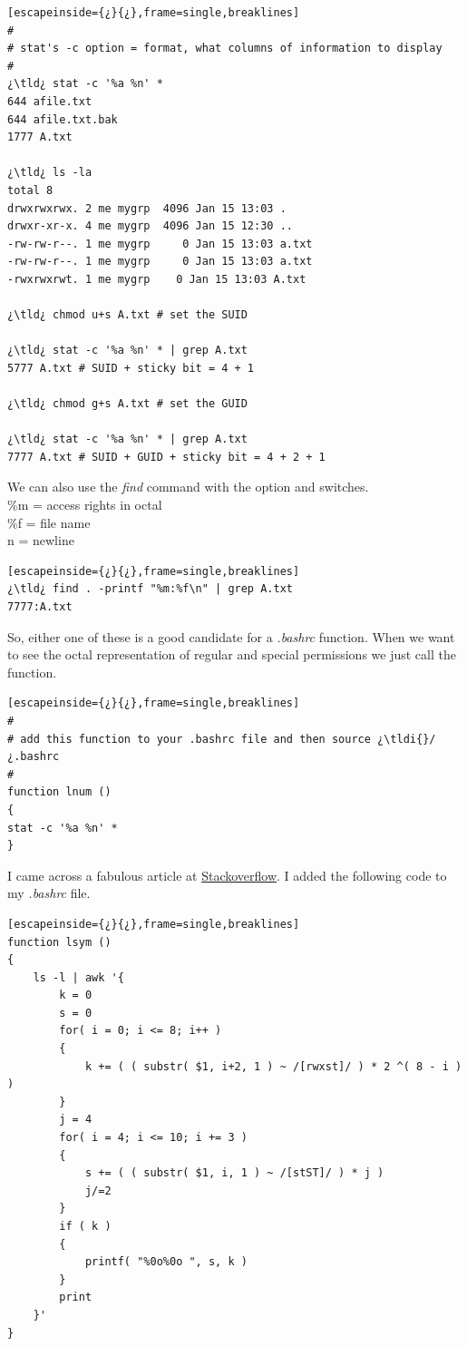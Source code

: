 \begin{lstlisting}[escapeinside={¿}{¿},frame=single,breaklines]
#
# stat's -c option = format, what columns of information to display
#
¿\tld¿ stat -c '%a %n' *
644 afile.txt
644 afile.txt.bak
1777 A.txt

¿\tld¿ ls -la
total 8
drwxrwxrwx. 2 me mygrp  4096 Jan 15 13:03 .
drwxr-xr-x. 4 me mygrp  4096 Jan 15 12:30 ..
-rw-rw-r--. 1 me mygrp     0 Jan 15 13:03 a.txt
-rw-rw-r--. 1 me mygrp     0 Jan 15 13:03 a.txt
-rwxrwxrwt. 1 me mygrp    0 Jan 15 13:03 A.txt

¿\tld¿ chmod u+s A.txt # set the SUID

¿\tld¿ stat -c '%a %n' * | grep A.txt
5777 A.txt # SUID + sticky bit = 4 + 1

¿\tld¿ chmod g+s A.txt # set the GUID

¿\tld¿ stat -c '%a %n' * | grep A.txt
7777 A.txt # SUID + GUID + sticky bit = 4 + 2 + 1
\end{lstlisting}

We can also use the \emph{find} command with the  option and switches.\\	

\%m = access rights in octal\\
\%f = file name
\\n = newline\\

\begin{lstlisting}[escapeinside={¿}{¿},frame=single,breaklines]
¿\tld¿ find . -printf "%m:%f\n" | grep A.txt
7777:A.txt
\end{lstlisting}

So, either one of these is a good candidate for a \textsl{.bashrc} function. When we want to see the octal representation of regular and special permissions we just call the function.

\begin{lstlisting}[escapeinside={¿}{¿},frame=single,breaklines]
#
# add this function to your .bashrc file and then source ¿\tldi{}/¿.bashrc
#
function lnum ()
{
stat -c '%a %n' *
}
\end{lstlisting}

I came across a fabulous article at \href{http://stackoverflow.com/questions/1795976/can-the-unix-list-command-ls-output-numerical-chmod-permissions}{Stackoverflow}. I added the following code to my \textsl{.bashrc} file.

\begin{lstlisting}[escapeinside={¿}{¿},frame=single,breaklines]
function lsym ()
{
	ls -l | awk '{
		k = 0
		s = 0
		for( i = 0; i <= 8; i++ )
		{
			k += ( ( substr( $1, i+2, 1 ) ~ /[rwxst]/ ) * 2 ^( 8 - i ) )
		}
		j = 4 
		for( i = 4; i <= 10; i += 3 )
		{
			s += ( ( substr( $1, i, 1 ) ~ /[stST]/ ) * j )
			j/=2
		}
		if ( k )
		{
			printf( "%0o%0o ", s, k )
		}
		print
	}'
}	
\end{lstlisting}

